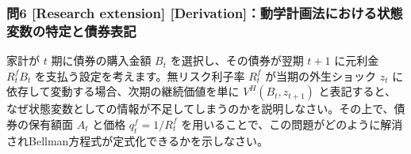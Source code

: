 \documentclass[
  japanese,
  lualatex,
  ja=standard,
  12pt,
  a4paper]{ltjsarticle}
\begin{document}
\subsubsection{問6 {[}Research extension{]}
{[}Derivation{]}：動学計画法における状態変数の特定と債券表記}\label{ux554f6-research-extension-derivationux52d5ux5b66ux8a08ux753bux6cd5ux306bux304aux3051ux308bux72b6ux614bux5909ux6570ux306eux7279ux5b9aux3068ux50b5ux5238ux8868ux8a18}

家計が \(t\) 期に債券の購入金額 \(B_t\) を選択し、その債券が翌期 \(t+1\)
に元利金 \(R_t^f B_t\) を支払う設定を考えます。無リスク利子率 \(R_t^f\)
が当期の外生ショック \(z_t\)
に依存して変動する場合、次期の継続価値を単に \(V^H(B_t, z_{t+1})\)
と表記すると、なぜ状態変数としての情報が不足してしまうのかを説明しなさい。その上で、債券の保有額面
\(A_t\) と価格 \(q_t^f = 1/R_t^f\)
を用いることで、この問題がどのように解消されBellman方程式が定式化できるかを示しなさい。
\end{document}
